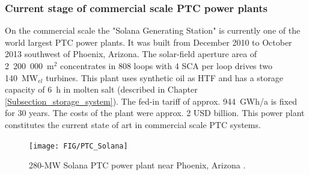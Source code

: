 \documentclass[Master,MEE,english]{twbook}%
\begin{document}
\subsubsection{Current stage of commercial scale PTC power plants}
On the commercial  scale the "Solana Generating Station" is currently one of the world largest PTC power plants. It was built from December 2010 to October 2013 southwest of Phoenix, Arizona. The solar-field aperture area of 2~200~000~m$^2$ concentrates in 808 loops with 4 SCA per loop drives two 140~MW$_{el}$ turbines. This plant uses synthetic oil as HTF and has a storage capacity of 6~h in molten salt (described in Chapter \ref{Subsection_storage_system}). The fed-in tariff of approx. 944~GWh/a is fixed for 30 years. The costs of the plant were approx. 2 USD billion. This power plant constitutes the current state of art in commercial scale PTC systems. \cite{NREL2015d}
\begin{figure}[!h] 
\centering
\texttt{[image: FIG/PTC\_Solana]}
\caption[280-MW Solana PTC power plant near Phoenix, Arizona.]{280-MW Solana PTC power plant near Phoenix, Arizona \cite{AbengoaSolar2013a}.}\label{PTC_Solana}
\end{figure}
\pagebreak
\end{document}
